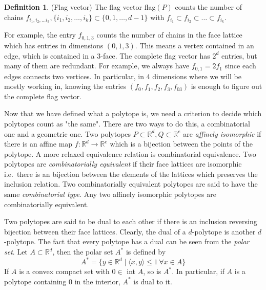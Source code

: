 \documentclass[a4paper,12pt]{book}
\theoremstyle{plain}
\theoremstyle{definition}
\newtheorem{definition}[theorem]{Definition}
\begin{document}
\begin{definition}
 (Flag vector) The flag vector flag$(P)$ counts the number of chains $f_{i_1,i_2,\dots i_k}, \{i_1,i_2,\dots, i_k \} \subset \{0,1,\dots, d-1\}$
with $f_{i_1} \subset f_{i_2} \subset \dots \subset f_{i_k}$.
\end{definition}

For example, the entry $f_{0,1,3}$ counts the number of chains in the face 
lattice which has entries in dimensions $(0,1,3)$. This means a vertex contained in an
edge, which is contained in a 3-face. The complete flag vector has $2^d$ entries,
but many of them are redundant. For example, we always have $f_{0,1} = 2f_1$ since each edges
connects two vertices. In particular, in 4 dimensions where we will be mostly working in,
knowing the entries $(f_0, f_1, f_2, f_3, f_{03})$ is enough to figure out the complete flag vector.

Now that we have defined what a polytope is, we need a criterion to decide which polytopes 
count as "the same". There are two ways to do this, a combinatorial one and a geometric one.
Two polytopes $P\subset \mathbb{R}^d, Q \subset \mathbb{R}^e$ are 
\textit{affinely isomorphic} if there is an affine map $f: \mathbb{R}^d 
\rightarrow \mathbb{R}^e$ which is a bijection between the points of the 
polytope. A more relaxed equivalence relation is combinatorial equivalence. Two 
polytopes are \textit{combinatorially equivalent} if their face lattices are isomorphic 
i.e.\ there is an bijection between the elements of the lattices which preserves
the inclusion relation. Two combinatorially equivalent polytopes are said to have the 
same \textit{combinatorial type}. Any two affinely isomorphic polytopes are combinatorially
equivalent.


Two polytopes are said to be dual to each other if there is an inclusion 
reversing bijection between their face lattices. Clearly, the dual of a 
$d$-polytope is another $d$-polytope. The fact that every polytope has a dual 
can be seen from the \textit{polar set}. Let $A\subset \mathbb{R}^d$, then the 
polar set $A^*$ is defined by
\begin{equation}
 A^* = \{y \in \mathbb{R}^d \mid \langle x,y\rangle \leq 1 \, \forall  x  \in A 
\} 
\end{equation}
If $A$ is a convex compact set with $0 \in$ int $A$, so is $A^*$. In 
particular, if $A$ is a polytope containing $0$ in the interior, $A^*$ is dual 
to it. 
\end{document}
